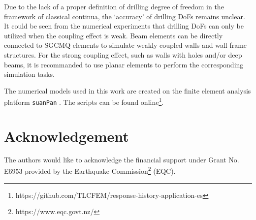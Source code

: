 \documentclass[3p,sort&compress,review,11pt,fleqn]{elsarticle}
\begin{document}
Due to the lack of a proper definition of drilling degree of freedom in the framework of classical continua, the `accuracy' of drilling DoFs remains unclear. It could be seen from the numerical experiments that drilling DoFs can only be utilized when the coupling effect is weak. Beam elements can be directly connected to SGCMQ elements to simulate weakly coupled walls and wall-frame structures. For the strong coupling effect, such as walls with holes and/or deep beams, it is recommanded to use planar elements to perform the corresponding simulation tasks.

The numerical models used in this work are created on the finite element analysis platform \texttt{suanPan} \citep{Chang2019b}. The scripts can be found online\footnote{https://github.com/TLCFEM/response-history-application-es}.
\section*{Acknowledgement}
The authors would like to acknowledge the financial support under Grant No. E6953 provided by the Earthquake Commission\footnote{https://www.eqc.govt.nz/} (EQC).

\end{document}

